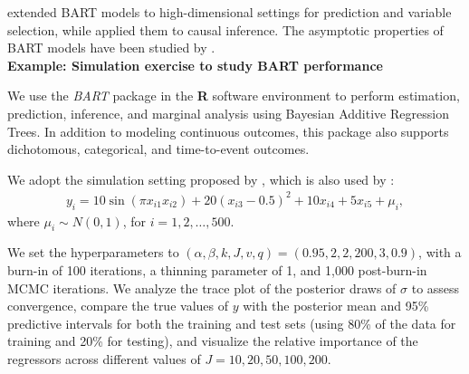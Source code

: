 \cite{linero2018bayesian} extended BART models to high-dimensional settings for prediction and variable selection, while \cite{hill2011bayesian, hahn2020bayesian} applied them to causal inference. The asymptotic properties of BART models have been studied by \cite{rockova2019on, rockova2020posterior, rockova2020semiparametric}.\\

\textbf{Example: Simulation exercise to study BART performance}

We use the \textit{BART} package \cite{sparapani2021nonparametric} in the \textbf{R} software environment to perform estimation, prediction, inference, and marginal analysis using Bayesian Additive Regression Trees. In addition to modeling continuous outcomes, this package also supports dichotomous, categorical, and time-to-event outcomes.

We adopt the simulation setting proposed by \cite{friedman1991multivariate}, which is also used by \cite{chipman2010bart}:
\begin{align*}
	y_i = 10\sin(\pi x_{i1}x_{i2}) + 20(x_{i3}-0.5)^2 + 10 x_{i4} + 5 x_{i5} + \mu_i,
\end{align*}
where \( \mu_i \sim N(0,1) \), for \( i = 1, 2, \dots, 500 \).

We set the hyperparameters to \( (\alpha, \beta, k, J, v, q) = (0.95, 2, 2, 200, 3, 0.9) \), with a burn-in of 100 iterations, a thinning parameter of 1, and 1,000 post-burn-in MCMC iterations. We analyze the trace plot of the posterior draws of \( \sigma \) to assess convergence, compare the true values of \( y \) with the posterior mean and 95\% predictive intervals for both the training and test sets (using 80\% of the data for training and 20\% for testing), and visualize the relative importance of the regressors across different values of \( J = 10, 20, 50, 100, 200 \).

